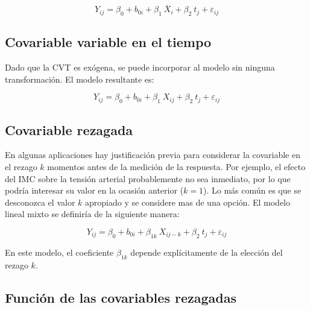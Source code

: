 \documentclass[spanish]{article}
\numberwithin{figure}{subsection}
\numberwithin{equation}{subsection}
\numberwithin{table}{subsection}
\begin{document}
\[ Y_{ij} = \beta_0 + b_{0i} + \beta_1\ \overline{X}_i + \beta_2\ t_j + \varepsilon_{ij} \]


\subsection{Covariable variable en el tiempo}

Dado que la CVT es exógena, se puede incorporar al modelo sin ninguna
transformación. El modelo resultante es:

\[ Y_{ij} = \beta_0 + b_{0i} + \beta_1\ X_{ij} + \beta_2\ t_j + \varepsilon_{ij} \]


\subsection{Covariable rezagada}

En algunas aplicaciones hay justificación previa para considerar la covariable
en el rezago $k$ momentos antes de la medición de la respuesta. Por ejemplo, el
efecto del IMC sobre la tensión arterial probablemente no sea inmediato, por lo
que podría interesar su valor en la ocasión anterior ($k=1$). Lo más común es
que se desconozca el valor $k$ apropiado y se considere mas de una opción. El
modelo lineal mixto se definiría de la siguiente manera:

\[ Y_{ij} = \beta_0 + b_{0i} + \beta_{1k}\ X_{ij-k} + \beta_2\ t_j + \varepsilon_{ij} \]

En este modelo, el coeficiente $\beta_{1k}$ depende explícitamente de la
elección del rezago $k$.


\subsection{Función de las covariables rezagadas}
\end{document}
